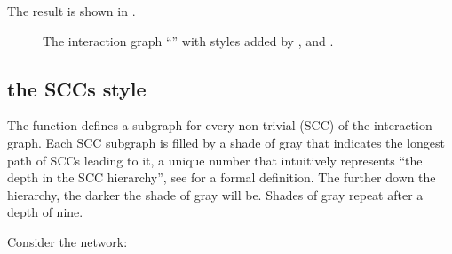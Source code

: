 \documentclass[letterpaper,10pt,english]{sphinxmanual}
\begin{document}
The result is shown in {\hyperref[\detokenize{Manual:figure04}]{}}.

\begin{figure}[htbp]
\centering
\capstart

\noindent{}
\caption{The interaction graph “” with styles added by {\hyperref[\detokenize{InteractionGraphs:add-style-inputs}]{}}, {\hyperref[\detokenize{InteractionGraphs:add-style-outputs}]{}} and {\hyperref[\detokenize{InteractionGraphs:add-style-constants}]{}}.}\label{\detokenize{Manual:figure04}}\label{\detokenize{Manual:id9}}\end{figure}


\subsection{the SCCs style}
\label{\detokenize{Manual:the-sccs-style}}
The function {\hyperref[\detokenize{InteractionGraphs:add-style-sccs}]{}} defines a  subgraph for every non-trivial  (SCC) of the interaction graph.
Each SCC subgraph is filled by a shade of gray that indicates the longest path of SCCs leading to it,
a unique number that intuitively represents “the depth in the SCC hierarchy”, see {\hyperref[\detokenize{Bibliography:klarner2015approx}]{}} for a formal definition.
The further down the hierarchy, the darker the shade of gray will be.
Shades of gray repeat after a depth of nine.

Consider the network:
\end{document}
